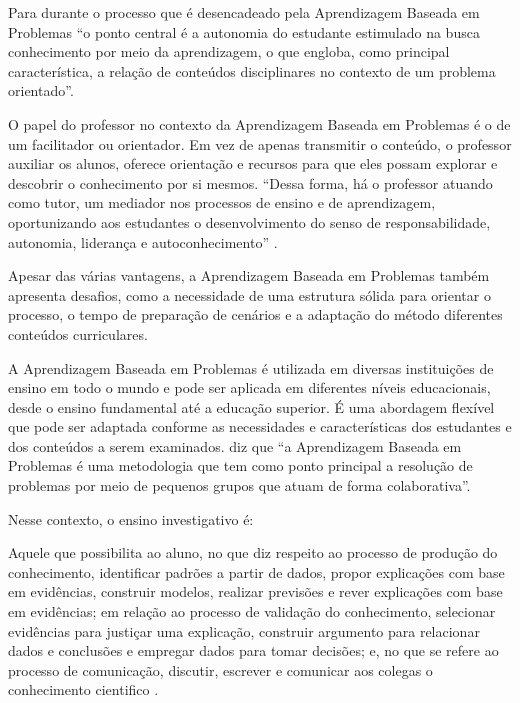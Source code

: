 Para  durante o processo que é desencadeado pela Aprendizagem Baseada em Problemas ``o ponto central é a autonomia do estudante estimulado na busca conhecimento por meio da aprendizagem, o que engloba, como principal característica, a relação de conteúdos disciplinares no contexto de um problema orientado''.

O papel do professor no contexto da Aprendizagem Baseada em Problemas é o de um facilitador ou orientador. Em vez de apenas transmitir o conteúdo, o professor auxiliar os alunos, oferece orientação e recursos para que eles possam explorar e descobrir o conhecimento por si mesmos. ``Dessa forma, há o professor atuando como tutor, um mediador nos processos de ensino e de aprendizagem, oportunizando aos estudantes o desenvolvimento do senso de responsabilidade, autonomia, liderança e autoconhecimento'' \cite[p. 44]{NUNES2022}.

Apesar das várias vantagens, a Aprendizagem Baseada em Problemas também apresenta desafios, como a necessidade de uma estrutura sólida para orientar o processo, o tempo de preparação de cenários e a adaptação do método diferentes conteúdos curriculares.

A Aprendizagem Baseada em Problemas é utilizada em diversas instituições de ensino em todo o mundo e pode ser aplicada em diferentes níveis educacionais, desde o ensino fundamental até a educação superior. É uma abordagem flexível que pode ser adaptada conforme as necessidades e características dos estudantes e dos conteúdos a serem examinados.  diz que ``a Aprendizagem Baseada em Problemas é uma metodologia que tem como ponto principal a resolução de problemas por meio de pequenos grupos que atuam de forma colaborativa''.

Nesse contexto, o ensino investigativo é:

\begin{citacao}
    Aquele que possibilita ao aluno, no que diz respeito ao processo de produção do conhecimento, identificar padrões a partir de dados, propor explicações com base em evidências, construir modelos, realizar previsões e rever explicações com base em evidências; em relação ao processo de validação do conhecimento, selecionar evidências para justiçar uma explicação, construir argumento para relacionar dados e conclusões e empregar dados para tomar decisões; e, no que se refere ao processo de comunicação, discutir, escrever e comunicar aos colegas o conhecimento cientifico \cite{SCARPA-SILVA2013}.
\end{citacao}


